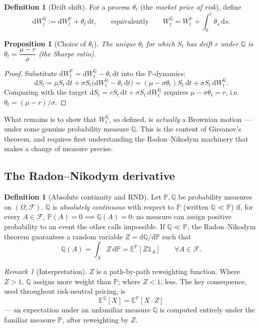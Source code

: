 \documentclass[11pt]{article}
\newtheorem{proposition}[theorem]{Proposition}
\theoremstyle{definition}
\newtheorem{definition}[theorem]{Definition}
\theoremstyle{remark}
\newtheorem{remark}[theorem]{Remark}
\newcommand{\dd}{\mathrm{d}}
\newcommand{\E}{\mathbb{E}}
\renewcommand{\P}{\mathbb{P}}
\newcommand{\Q}{\mathbb{Q}}
\newcommand{\F}{\mathcal{F}}
\begin{document}
\begin{definition}[Drift shift]
For a process $\theta_t$ (the \emph{market price of risk}), define
\[
\dd W_t^\Q := \dd W_t^\P + \theta_t\,\dd t, \qquad\text{equivalently}\qquad
W_t^\Q = W_t^\P + \int_0^t \theta_s\,\dd s.
\]
\end{definition}

\begin{proposition}[Choice of $\theta_t$]
The unique $\theta_t$ for which $S_t$ has drift $r$ under $\Q$ is $\theta_t = \dfrac{\mu-r}{\sigma}$
(the Sharpe ratio).
\end{proposition}

\begin{proof}
Substitute $\dd W_t^\P = \dd W_t^\Q - \theta_t\,\dd t$ into the $\P$-dynamics:
\[
\dd S_t = \mu S_t\,\dd t + \sigma S_t\big(\dd W_t^\Q - \theta_t\,\dd t\big)
= (\mu - \sigma\theta_t)S_t\,\dd t + \sigma S_t\,\dd W_t^\Q.
\]
Comparing with the target $\dd S_t = rS_t\,\dd t + \sigma S_t\,\dd W_t^\Q$ requires
$\mu - \sigma\theta_t = r$, i.e. $\theta_t = (\mu-r)/\sigma$.
\end{proof}

What remains is to show that $W_t^\Q$, so defined, is \emph{actually} a Brownian motion — under some
genuine probability measure $\Q$. This is the content of Girsanov's theorem, and requires first
understanding the Radon--Nikodym machinery that makes a change of measure precise.

\subsection{The Radon--Nikodym derivative}

\begin{definition}[Absolute continuity and RND]
Let $\P,\Q$ be probability measures on $(\Omega,\F)$. $\Q$ is \emph{absolutely continuous} with
respect to $\P$ (written $\Q \ll \P$) if, for every $A \in \F$, $\P(A) = 0 \implies \Q(A) = 0$: no
measure can assign positive probability to an event the other calls impossible. If $\Q \ll \P$, the
Radon--Nikodym theorem guarantees a random variable $Z = \dd\Q/\dd\P$ such that
\[
\Q(A) = \int_A Z\,\dd\P = \E^\P[Z\mathds{1}_A] \qquad \forall A \in \F.
\]
\end{definition}

\begin{remark}[Interpretation]
$Z$ is a path-by-path reweighting function. Where $Z>1$, $\Q$ assigns more weight than $\P$; where
$Z<1$, less. The key consequence, used throughout risk-neutral pricing, is
\[
\boxed{\ \E^\Q[X] = \E^\P[X\cdot Z]\ }
\]
— an expectation under an unfamiliar measure $\Q$ is computed entirely under the familiar measure
$\P$, after reweighting by $Z$.
\end{remark}
\end{document}
